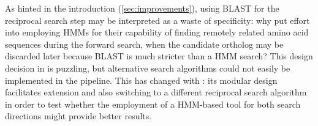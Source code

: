 As hinted in the introduction (\autoref{sec:improvements}), using BLAST for the
reciprocal search step may be interpreted as a waste of specificity: why put
effort into employing HMMs for their capability of finding remotely related
amino acid sequences during the forward search, when the candidate ortholog may
be discarded later because BLAST is much stricter than a HMM search? This design
decision in \hamstr is puzzling, but alternative search algorithms could not
easily be implemented in the pipeline. This has changed with \pname: its modular
design facilitates extension and also switching to a different reciprocal search
algorithm in order to test whether the employment of a HMM-based tool for both
search directions might provide better results.
